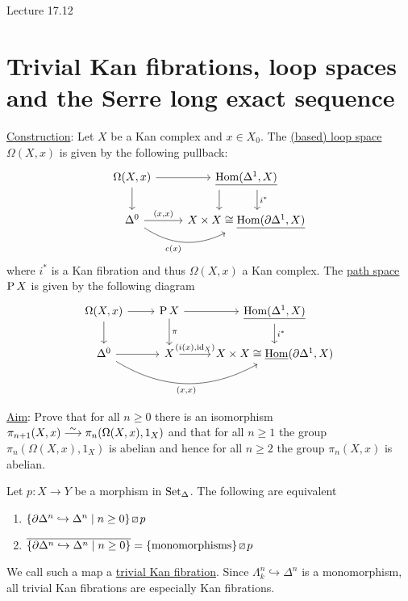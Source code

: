 Lecture 17.12

\section{Trivial Kan fibrations, loop spaces and the Serre long exact sequence}

\underline{Construction}:
Let $X$ be a Kan complex and $x \in X_0$.
The \underline{(based) loop space} $\Omega(X,x)$ is given by the following pullback:
\[
\begin{tikzcd}
    \Omega(X,x)
    \ar[r]
    \ar[d]
    &
    \underline{\Hom(\Delta^1, X)}
    \ar[d, shift left=4, "i^*"]
    \ar[d, shift right=10]
    \\
    \Delta^0
    \ar[r, "{(x,x)}"]
    \ar[r, bend right, "c(x)"']
    &
    X\times X \cong \underline{\Hom(\partial \Delta^1 , X)}
\end{tikzcd}
\]
where $i^*$ is a Kan fibration and thus $\Omega(X,x)$ a Kan complex.
The \underline{path space} $\operatorname{P} X$ is given by the following diagram 
\[
\begin{tikzcd}
    \Omega(X,x) 
    \ar[d]
    \ar[r]
    &
    \Pathspace X
    \ar[r]
    \ar[d, "\pi"]
    &
    \underline{\Hom (\Delta^1,X)}
    \ar[d, "i^*"]
    \\
    \Delta^0
    \ar[rr, bend right, "{(x,x)}"']
    \ar[r]
    &
    X
    \ar[r,"{(i(x), \id_X)}"]
    &
    X \times X
    \cong 
    \underline{\Hom}(\partial \Delta^1, X)
\end{tikzcd}
\]

\underline{Aim}: Prove that for all $n \geq 0$ there is an isomorphism $\pi_{n+1}(X,x) \isomorphism \pi_n ( \Omega(X,x), 1_X)$ and that for all $n \geq 1$ the group $\pi_n(\Omega(X,x),1_X)$ is abelian and hence for all $n \geq 2$ the group $\pi_n(X,x)$ is abelian.
\begin{defi/prop}
\label{trivial_Kan_fibration}
    Let $p\colon X \to Y$ be a morphism in $\operatorname{Set}_{\Delta}$. The following are equivalent 
    \begin{enumerate}
        \item 
        $\{ \partial\Delta^n \hookrightarrow \Delta^n \mid n \geq 0 \} \lift{} p$
        \item 
        $\overline{\{ \partial\Delta^n \hookrightarrow \Delta^n \mid n  \geq 0\}} = \{\text{monomorphisms}\} \lift{} p$
    \end{enumerate}
    We call such a map a \underline{trivial Kan fibration}.
    Since $\Lambda_k^n \hookrightarrow \Delta^n$ is a monomorphism, all trivial Kan fibrations are especially Kan fibrations.
\end{defi/prop}

